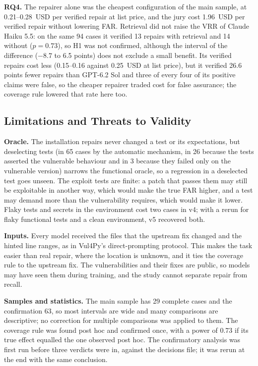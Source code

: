 \documentclass[ai,article,submit,oneauthor]{Definitions/mdpi}
\begin{document}
\textbf{RQ4.} The repairer alone was the cheapest configuration of the main sample, at 0.21--0.28~USD per verified repair at list price, and the jury cost 1.96~USD per verified repair without lowering FAR. Retrieval did not raise the VRR of Claude Haiku 5.5: on the same 94 cases it verified 13 repairs with retrieval and 14 without ($p=0.73$), so H1 was not confirmed, although the interval of the difference ($-8.7$ to 6.5 points) does not exclude a small benefit. Its verified repairs cost less (0.15--0.16 against 0.25~USD at list price), but it verified 26.6 points fewer repairs than GPT-6.2 Sol and three of every four of its positive claims were false, so the cheaper repairer traded cost for false assurance; the coverage rule lowered that rate here too.

\subsection{Limitations and Threats to Validity}\label{sec:limits}

\textbf{Oracle.} The installation repairs never changed a test or its expectations, but deselecting tests (in 65 cases by the automatic mechanism, in 26 because the tests asserted the vulnerable behaviour and in 3 because they failed only on the vulnerable version) narrows the functional oracle, so a regression in a deselected test goes unseen. The exploit tests are finite: a patch that passes them may still be exploitable in another way, which would make the true FAR higher, and a test may demand more than the vulnerability requires, which would make it lower. Flaky tests and secrets in the environment cost two cases in v4; with a rerun for flaky functional tests and a clean environment, v5 recovered both.

\textbf{Inputs.} Every model received the files that the upstream fix changed and the hinted line ranges, as in Vul4Py's direct-prompting protocol. This makes the task easier than real repair, where the location is unknown, and it ties the coverage rule to the upstream fix. The vulnerabilities and their fixes are public, so models may have seen them during training, and the study cannot separate repair from recall.

\textbf{Samples and statistics.} The main sample has 29 complete cases and the confirmation 63, so most intervals are wide and many comparisons are descriptive; no correction for multiple comparisons was applied to them. The coverage rule was found post hoc and confirmed once, with a power of 0.73 if its true effect equalled the one observed post hoc. The confirmatory analysis was first run before three verdicts were in, against the decisions file; it was rerun at the end with the same conclusion.
\end{document}
